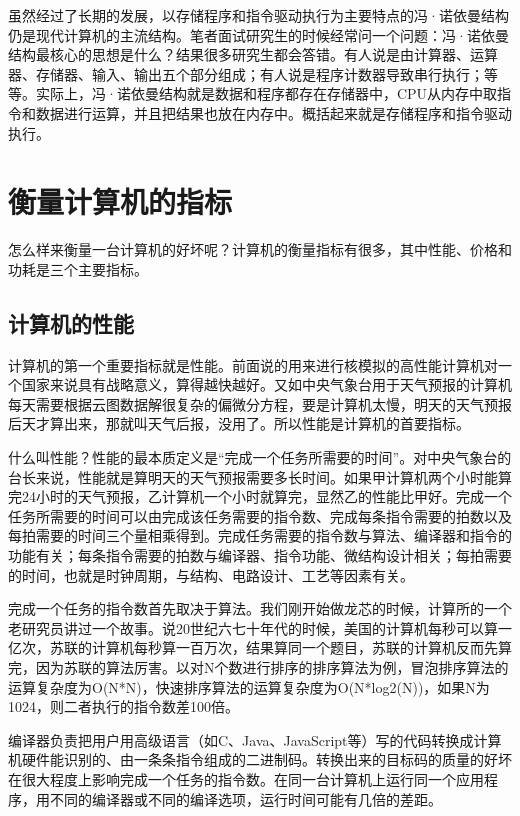 \documentclass[]{ctexbook}
\begin{document}
虽然经过了长期的发展，以存储程序和指令驱动执行为主要特点的冯·诺依曼结构仍是现代计算机的主流结构。笔者面试研究生的时候经常问一个问题：冯·诺依曼结构最核心的思想是什么？结果很多研究生都会答错。有人说是由计算器、运算器、存储器、输入、输出五个部分组成；有人说是程序计数器导致串行执行；等等。实际上，冯·诺依曼结构就是数据和程序都存在存储器中，CPU从内存中取指令和数据进行运算，并且把结果也放在内存中。概括起来就是存储程序和指令驱动执行。

\hypertarget{ux8861ux91cfux8ba1ux7b97ux673aux7684ux6307ux6807}{%
\section{衡量计算机的指标}\label{ux8861ux91cfux8ba1ux7b97ux673aux7684ux6307ux6807}}

怎么样来衡量一台计算机的好坏呢？计算机的衡量指标有很多，其中性能、价格和功耗是三个主要指标。

\hypertarget{ux8ba1ux7b97ux673aux7684ux6027ux80fd}{%
\subsection{计算机的性能}\label{ux8ba1ux7b97ux673aux7684ux6027ux80fd}}

计算机的第一个重要指标就是性能。前面说的用来进行核模拟的高性能计算机对一个国家来说具有战略意义，算得越快越好。又如中央气象台用于天气预报的计算机每天需要根据云图数据解很复杂的偏微分方程，要是计算机太慢，明天的天气预报后天才算出来，那就叫天气后报，没用了。所以性能是计算机的首要指标。

什么叫性能？性能的最本质定义是``完成一个任务所需要的时间''。对中央气象台的台长来说，性能就是算明天的天气预报需要多长时间。如果甲计算机两个小时能算完24小时的天气预报，乙计算机一个小时就算完，显然乙的性能比甲好。完成一个任务所需要的时间可以由完成该任务需要的指令数、完成每条指令需要的拍数以及每拍需要的时间三个量相乘得到。完成任务需要的指令数与算法、编译器和指令的功能有关；每条指令需要的拍数与编译器、指令功能、微结构设计相关；每拍需要的时间，也就是时钟周期，与结构、电路设计、工艺等因素有关。

完成一个任务的指令数首先取决于算法。我们刚开始做龙芯的时候，计算所的一个老研究员讲过一个故事。说20世纪六七十年代的时候，美国的计算机每秒可以算一亿次，苏联的计算机每秒算一百万次，结果算同一个题目，苏联的计算机反而先算完，因为苏联的算法厉害。以对N个数进行排序的排序算法为例，冒泡排序算法的运算复杂度为O(N*N)，快速排序算法的运算复杂度为O(N*log2(N))，如果N为1024，则二者执行的指令数差100倍。

编译器负责把用户用高级语言（如C、Java、JavaScript等）写的代码转换成计算机硬件能识别的、由一条条指令组成的二进制码。转换出来的目标码的质量的好坏在很大程度上影响完成一个任务的指令数。在同一台计算机上运行同一个应用程序，用不同的编译器或不同的编译选项，运行时间可能有几倍的差距。
\end{document}
